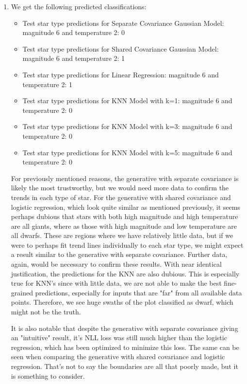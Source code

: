 \documentclass[submit]{harvardml}
\begin{document}
\begin{enumerate}
    \item We get the following predicted classifications:
    
    \begin{itemize}
        \item Test star type predictions for Separate Covariance Gaussian Model: magnitude 6 and temperature 2: 0
        \item Test star type predictions for Shared Covariance Gaussian Model:
        magnitude 6 and temperature 2: 1
        \item Test star type predictions for Linear Regression: magnitude 6 and temperature 2: 1
        \item Test star type predictions for KNN Model with k=1:
        magnitude 6 and temperature 2: 0
        \item Test star type predictions for KNN Model with k=3:
        magnitude 6 and temperature 2: 0
        \item Test star type predictions for KNN Model with k=5:
        magnitude 6 and temperature 2: 0
    \end{itemize}

    For previously mentioned reasons, the generative with separate covariance is likely the most trustworthy, but we would need more data to confirm the trends in each type of star. For the generative with shared covariance and logistic regression, which look quite similar as mentioned previously, it seems perhaps dubious that stars with both high magnitude and high temperature are all giants, where as those with high magnitude and low temperature are all dwarfs. These are regions where we have relatively little data, but if we were to perhaps fit trend lines individually to each star type, we might expect a result similar to the generative with separate covariance. Further data, again, would be necessary to confirm these results. With near identical justification, the predictions for the KNN are also dubious. This is especially true for KNN's since with little data, we are not able to make the best fine-grained predictions, especially for inputs that are "far" from all available data points. Therefore, we see huge swaths of the plot classified as dwarf, which might not be the truth. 
    
    It is also notable that despite the generative with separate covariance giving an "intuitive" result, it's NLL loss was still much higher than the logistic regression, which has been optimized to minimize this loss. The same can be seen when comparing the generative with shared covariance and logistic regression. That's not to say the boundaries are all that poorly made, but it is something to consider. 
    
    
\end{enumerate}
\end{document}
